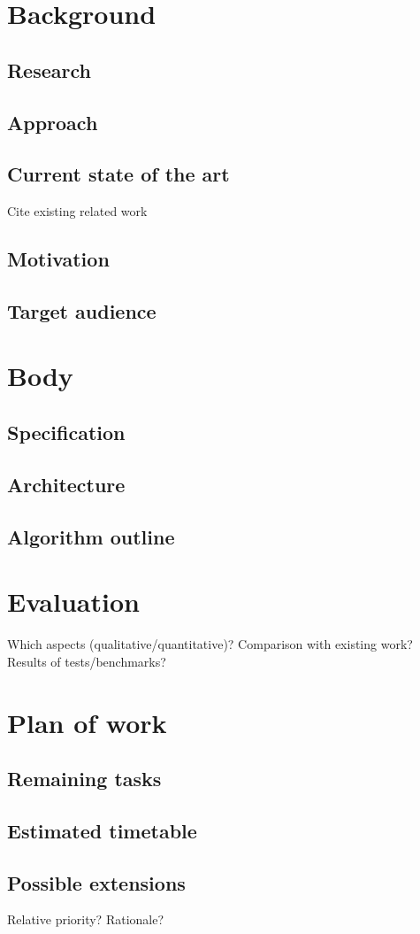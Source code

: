 \documentclass{icldt}
\begin{document}
\chapter{Background}
\section{Research}
\section{Approach}
\section{Current state of the art}

Cite existing related work

\section{Motivation}
\section{Target audience}

\chapter{Body}
\section{Specification}
\section{Architecture}
\section{Algorithm outline}

\chapter{Evaluation}

Which aspects (qualitative/quantitative)? Comparison with existing work? Results of tests/benchmarks?

\chapter{Plan of work}
\section{Remaining tasks}
\section{Estimated timetable}
\section{Possible extensions}

Relative priority? Rationale?


\nocite{*}
\end{document}
